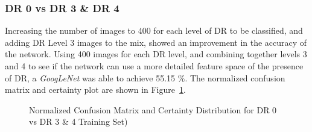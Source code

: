 \documentclass[letterpaper,12pt]{article}
\newcommand{\figref}[1]{Figure~\ref{#1}}
\begin{document}
\subsubsection{DR 0 vs DR 3 \& DR 4}

Increasing the number of images to 400 for each level of DR to be classified, and adding DR Level 3 images to the mix, showed an improvement in the accuracy of the network. Using 400 images for each DR level, and combining together levels 3 and 4 to see if the network can use a more detailed feature space of the presence of DR, a \textit{GoogLeNet} was able to achieve 55.15 $\%$. The normalized confusion matrix and certainty plot are shown in \figref{DR0_DR3_4}.

\begin{figure}[htbp]
\begin{center}
\caption{Normalized Confusion Matrix and Certainty Distribution for DR 0 vs DR 3 \& 4 Training Set)}
\label{DR0_DR3_4}
\end{center}
\end{figure}
\end{document}
